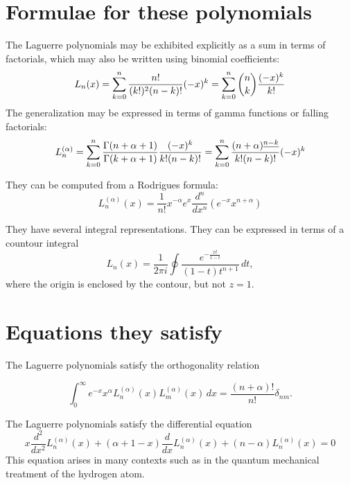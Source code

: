 \documentclass[12pt]{article}
\begin{document}
\section{Formulae for these polynomials}

The Laguerre polynomials may be exhibited explicitly as a sum in terms
of factorials, which may also be written using binomial coefficients:
 \[L_n (x) = \sum_{k=0}^n {n! \over (k!)^2 (n-k)!} (-x)^k =
\sum_{k=0}^n {n \choose k} {(-x)^k \over k!}\]
The generalization may be expressed in terms of gamma functions or
falling factorials:
 \[L_n^{(\alpha)} = \sum_{k=0}^n {\Gamma (n + \alpha + 1) \over
\Gamma (k + \alpha + 1)} {(-x)^k \over k! (n-k)!} = \sum_{k=0}^n
{(n + \alpha)^{\underline{n-k}} \over k! (n-k)!} (-x)^k \]

They can be computed from a Rodrigues formula:
\[L_n^{(\alpha)} (x)= \frac{1}{n!} x^{-\alpha} e^x 
\frac{d^n}{dx^n} \left( e^{-x} x^{n + \alpha} \right)\]

They have several integral representations.  They can be expressed
in terms of a countour integral
\[L_n(x) = \frac{1}{2\pi i} \oint \frac{e^{-\frac{xt} {1-t}}}
{(1-t)t^{n+1}} \, \mathit{dt},\]
where the origin is enclosed by the contour, but not $z=1$.


\section{Equations they satisfy}

The Laguerre polynomials satisfy the orthogonality relation

\[
\int_0^{\infty}e^{-x} x^\alpha L_n^{(\alpha)} (x) 
L_m^{(\alpha)} (x) \, dx = \frac {(n+\alpha)!} {n!} 
\delta_{nm}.
\]

The Laguerre polynomials satisfy the differential equation
\[
x \frac{d^2}{dx^2} L_n^{(\alpha)} (x) + 
(\alpha+1-x) \frac{d}{dx} L_n^{(\alpha)} (x) + 
(n-\alpha) L_n^{(\alpha)} (x) = 0
\]
This equation arises in many contexts such as in the quantum 
mechanical treatment of the hydrogen atom.

\end{document}
